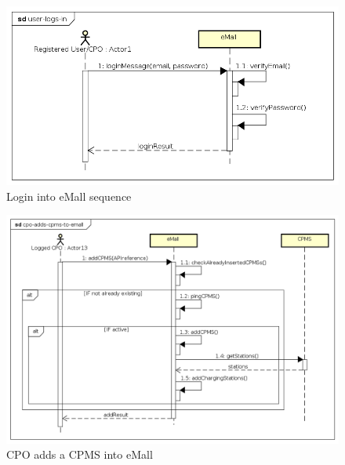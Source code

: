 \begin{figure}[!h]
    \begin{center}
        \includegraphics[keepaspectratio, width=16cm]{Sequence/user-logs-in.png}
        \caption{Login into \ac{eMall} sequence}
    \end{center}
\end{figure}
\begin{figure}[!h]
    \begin{center}
        \includegraphics[keepaspectratio, width=16cm]{Sequence/cpo-adds-cpms-to-emall.png}
        \caption{\ac{CPO} adds a \ac{CPMS} into \ac{eMall}}
    \end{center}
\end{figure}
